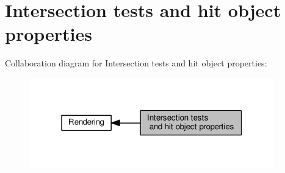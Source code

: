 \hypertarget{group__intersection__test__prperties}{}\section{Intersection tests and hit object properties}
\label{group__intersection__test__prperties}
Collaboration diagram for Intersection tests and hit object properties\+:\nopagebreak
\begin{figure}[H]
\begin{center}
\leavevmode
\includegraphics[width=301pt]{group__intersection__test__prperties}
\end{center}
\end{figure}

